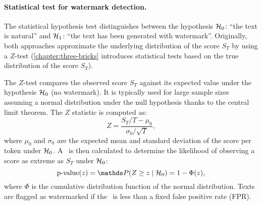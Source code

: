\paragraph*{Statistical test for watermark detection.} 
The statistical hypothesis test distinguishes between the hypothesis $\mathcal{H}_0$: ``the text is natural'' and $\mathcal{H}_1$: ``the text has been generated with watermark''.
Originally, both approaches approximate the underlying distribution of the score $S_T$ by using a $Z$-test (\autoref{chapter:three-bricks} introduces statistical tests based on the true distribution of the score $S_T$).

The $Z$-test compares the observed score $S_T$ against its expected value under the hypothesis $\mathcal{H}_0$ (no watermark).
It is typically used for large sample sizes assuming a normal distribution under the null hypothesis thanks to the central limit theorem.  
The $Z$ statistic is computed as:
\begin{equation}
    Z = \frac{{S_T/T - \mu_0}}{{\sigma_0 / \sqrt{T}}},
\end{equation}
where $\mu_0$ and $\sigma_0$ are the expected mean and standard deviation of the score per token under $\mathcal{H}_0$.
A \pval\ is then calculated to determine the likelihood of observing a score as extreme as $S_T$ under $\mathcal{H}_0$:
\begin{equation}
    \text{p-value}(z) = \Prob(Z \geq z \mid \H_0) = 1 - \Phi(z),
\end{equation}
where $\Phi$ is the cumulative distribution function of the normal distribution. 
Texts are flagged as watermarked if the \pval\ is less than a fixed false positive rate (FPR).
